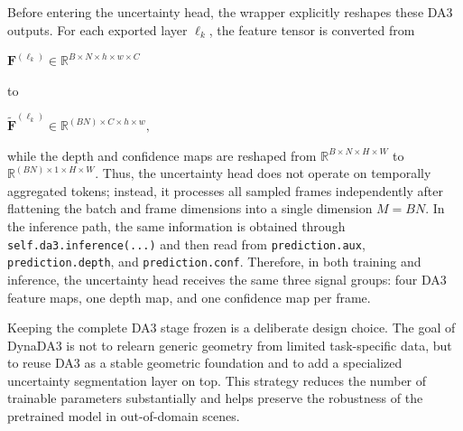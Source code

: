 Before entering the uncertainty head, the wrapper explicitly reshapes these DA3 outputs. For each exported layer $\ell_k$, the feature tensor is converted from
\begin{center}
    $\displaystyle \mathbf{F}^{(\ell_k)} \in \mathbb{R}^{B\times N\times h\times w\times C}$
\end{center}
to
\begin{center}
    $\displaystyle \tilde{\mathbf{F}}^{(\ell_k)} \in \mathbb{R}^{(BN)\times C\times h\times w},$
\end{center}
while the depth and confidence maps are reshaped from $\mathbb{R}^{B\times N\times H\times W}$ to $\mathbb{R}^{(BN)\times 1\times H\times W}$. Thus, the uncertainty head does not operate on temporally aggregated tokens; instead, it processes all sampled frames independently after flattening the batch and frame dimensions into a single dimension $M=BN$. In the inference path, the same information is obtained through \texttt{self.da3.inference(...)} and then read from \texttt{prediction.aux}, \texttt{prediction.depth}, and \texttt{prediction.conf}. Therefore, in both training and inference, the uncertainty head receives the same three signal groups: four DA3 feature maps, one depth map, and one confidence map per frame.

Keeping the complete DA3 stage frozen is a deliberate design choice. The goal of DynaDA3 is not to relearn generic geometry from limited task-specific data, but to reuse DA3 as a stable geometric foundation and to add a specialized uncertainty segmentation layer on top. This strategy reduces the number of trainable parameters substantially and helps preserve the robustness of the pretrained model in out-of-domain scenes.

